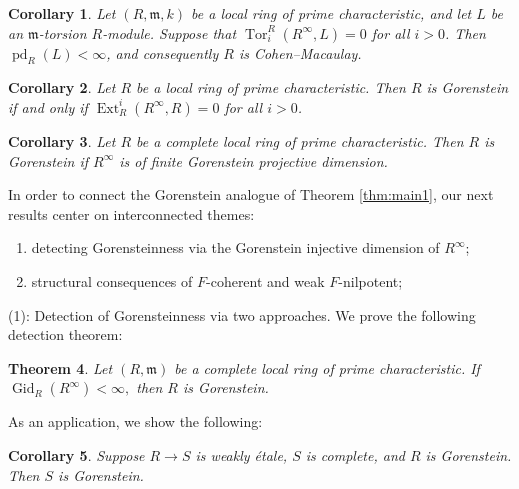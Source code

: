 \documentclass[11pt,a4paper]{amsart}
\numberwithin{equation}{section}
\newtheorem{theorem}{Theorem}[section]
\newtheorem{corollary}[theorem]{Corollary}
\theoremstyle{definition}
\theoremstyle{remark}
\begin{document}
\begin{corollary}
	\label{cor:tor}
	Let \((R,\mathfrak m,k)\) be a local ring of prime characteristic, and let \(L\) be an \(\mathfrak m\)-torsion \(R\)-module. Suppose that
	\(
	\operatorname{Tor}_i^R(R^\infty, L) = 0
	\)
	for all \(i > 0\). Then \(\operatorname{pd}_R(L) < \infty\), and consequently \(R\) is Cohen--Macaulay.
\end{corollary}

\begin{corollary}
	\label{cor:gorenstein1}
	Let \(R\) be a local ring of prime characteristic. Then \(R\) is Gorenstein if and only if \(\operatorname{Ext}_R^i(R^\infty, R) = 0\) for all \(i > 0\).
\end{corollary}

\begin{corollary}
	\label{cor:gorenstein2}
	Let \(R\) be a complete local ring of prime characteristic. Then \(R\) is Gorenstein if \(R^\infty\) is of finite Gorenstein projective dimension.
\end{corollary}

In order to connect the Gorenstein analogue of Theorem \ref{thm:main1}, our next results center on  interconnected themes:
\begin{enumerate}
	\item detecting Gorensteinness via the Gorenstein injective dimension of \(R^\infty\);
	\item structural consequences of \(F\)-coherent and weak \(F\)-nilpotent;

\end{enumerate}

\medskip

\noindent
(1): Detection of Gorensteinness via two approaches. 
We prove the following detection theorem:

\begin{theorem}
	\label{thm:gid}
	Let \((R,\mathfrak m)\) be a complete local ring of prime characteristic. If
	\(
	\operatorname{Gid}_R(R^\infty) < \infty,
	\)
	then \(R\) is Gorenstein.
\end{theorem}

As an application, we show the following:

\begin{corollary}
	\label{cor:weaklyetale}
	Suppose \(R \to S\) is weakly \'etale, \(S\) is complete, and \(R\) is Gorenstein. Then \(S\) is Gorenstein.
\end{corollary}
\end{document}
